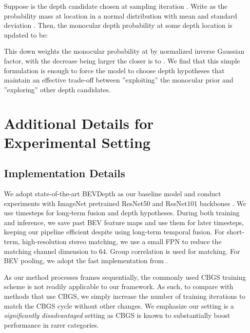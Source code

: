 \documentclass[runningheads, hyperfootnotes=false]{article}
\begin{document}
Suppose  is the depth candidate chosen at sampling iteration . Write  as the probability mass at location  in a normal distribution with mean  and standard deviation . Then, the monocular depth probability at some depth location  is updated to be:

This down weights the monocular probability at  by normalized inverse Gaussian factor, with the decrease being larger the closer  is to . We find that this simple formulation is enough to force the model to choose depth hypotheses that maintain an effective trade-off between ''exploiting'' the monocular prior and ''exploring'' other depth candidates. \section{Additional Details for Experimental Setting}\label{app:exp}
\subsection{Implementation Details}
We adopt state-of-the-art BEVDepth \citep{li2022bevdepth} as our baseline model and conduct experiments with ImageNet pretrained ResNet50 and ResNet101 backbones \citep{He2016DeepRL}. We use  timesteps for long-term fusion and  depth hypotheses. During both training and inference, we save past BEV feature maps and use them for later timesteps, keeping our pipeline efficient despite using long-term temporal fusion. For short-term, high-resolution stereo matching, we use a small FPN to reduce the matching channel dimension to 64. Group correlation \citep{Guo2019GroupWiseCS} is used for matching. For BEV pooling, we adopt the fast implementation from \citep{Liu2022BEVFusionMM}.

As our method processes frames sequentially, the commonly used CBGS \citep{Zhu2019ClassbalancedGA} training scheme is not readily applicable to our framework. As such, to compare with methods that use CBGS, we simply increase the number of training iterations to match the CBGS cycle without other changes. We emphasize our setting is a \textit{significantly disadvantaged} setting as CBGS is known to substantially boost performance in rarer categories.   
\end{document}

